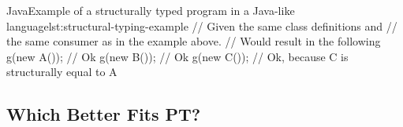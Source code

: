\begin{code}{Java}{Example of a structurally typed program in a Java-like language}{lst:structural-typing-example}
    // Given the same class definitions and
    // the same consumer as in the example above.
    // Would result in the following
    g(new A()); // Ok
    g(new B()); // Ok
    g(new C()); // Ok, because C is structurally equal to A
\end{code}

\subsection{Which Better Fits PT?}\label{subsec:which-better-fits-pt?}


